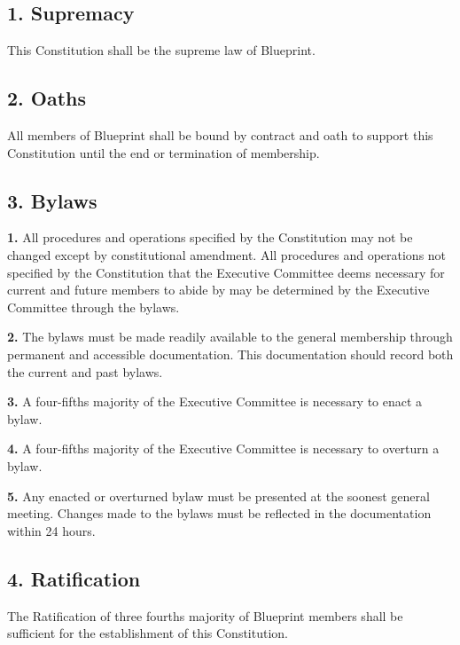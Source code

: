 \documentclass{article}
\begin{document}
\subsection{1. Supremacy}
This Constitution shall be the supreme law of Blueprint.

\subsection{2. Oaths}
All members of Blueprint shall be bound by contract and oath to support this Constitution until the end or termination of membership.

\subsection{3. Bylaws}
\textbf{1.} All procedures and operations specified by the Constitution may not be changed except by constitutional amendment. All procedures and operations not specified by the Constitution that the Executive Committee deems necessary for current and future members to abide by may be determined by the Executive Committee through the bylaws. 

\textbf{2.} The bylaws must be made readily available to the general membership through permanent and accessible documentation. This documentation should record both the current and past bylaws.

\textbf{3.} A four-fifths majority of the Executive Committee is necessary to enact a bylaw.

\textbf{4.} A four-fifths majority of the Executive Committee is necessary to overturn a bylaw.

\textbf{5.} Any enacted or overturned bylaw must be presented at the soonest general meeting. Changes made to the bylaws must be reflected in the documentation within 24 hours.

\subsection{4. Ratification}
The Ratification of three fourths majority of Blueprint members shall be sufficient for the establishment of this Constitution.
\end{document}
